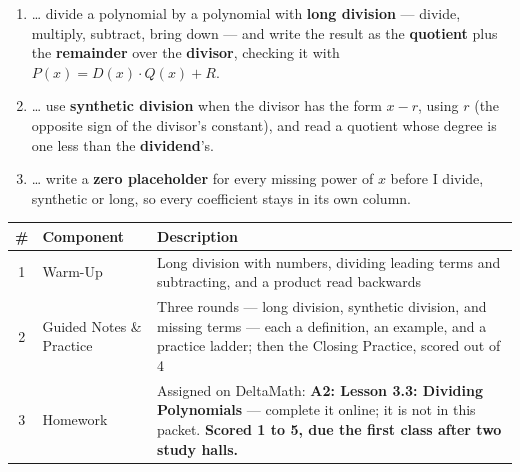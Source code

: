 \documentclass[12pt]{article}
\begin{document}

\namedateperiod
\vspace{0.18in}

\boxguard[14]
\begin{learningtargetbox}
\small
\begin{enumerate}[leftmargin=1.5em, itemsep=5pt]
  \item \ldots{} divide a polynomial by a polynomial with \textbf{long division} --- divide,
        multiply, subtract, bring down --- and write the result as the \textbf{quotient} plus
        the \textbf{remainder} over the \textbf{divisor}, checking it with
        $P(x) = D(x)\cdot Q(x) + R$.
  \item \ldots{} use \textbf{synthetic division} when the divisor has the form $x - r$, using
        $r$ (the opposite sign of the divisor's constant), and read a quotient whose degree is
        one less than the \textbf{dividend}'s.
  \item \ldots{} write a \textbf{zero placeholder} for every missing power of $x$ before I
        divide, synthetic or long, so every coefficient stays in its own column.
\end{enumerate}
\end{learningtargetbox}

\vspace{0.14in}

\boxguard[14]
\begin{tocbox}
\small
\renewcommand{\arraystretch}{1.5}
\begin{tabularx}{\linewidth}{@{} c l X @{}}
\rowcolor{forestbg}
\textbf{\#} & \textbf{Component} & \textbf{Description} \\
\midrule
1 & Warm-Up & Long division with numbers, dividing leading terms and subtracting, and a
              product read backwards \\
2 & Guided Notes \& Practice & Three rounds --- long division, synthetic division, and
              missing terms --- each a definition, an example, and a practice ladder; then the
              Closing Practice, scored out of 4 \\
3 & Homework & Assigned on DeltaMath: \textbf{A2: Lesson 3.3: Dividing Polynomials} --- complete it
              online; it is not in this packet. \textbf{Scored 1 to 5, due the first class after
              two study halls.} \\
\end{tabularx}
\end{tocbox}
\end{document}
